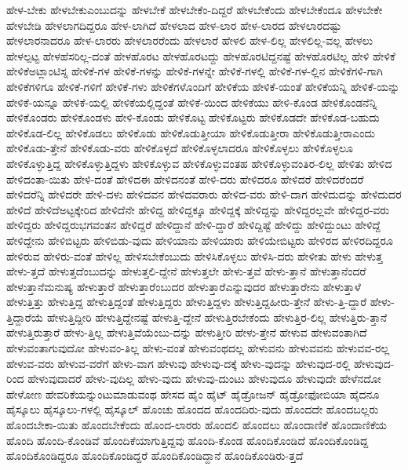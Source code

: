 {ಹೇಳ-ಬೇಕು
ಹೇಳಬೇಕುಎಂಬುದನ್ನು
ಹೇಳಬೇಕೆ
ಹೇಳಬೇಕೆಂ-ದಿದ್ದರೆ
ಹೇಳಬೇಕೆಂದು
ಹೇಳಬೇಕೆಂದೂ
ಹೇಳಬೇಕೇ
ಹೇಳಬೇಡಿ
ಹೇಳಲಾಗದಿದ್ದರೂ
ಹೇಳ-ಲಾಗಿದೆ
ಹೇಳಲಾದ
ಹೇಳ-ಲಾರ
ಹೇಳ-ಲಾರದ
ಹೇಳಲಾರದಷ್ಟು
ಹೇಳಲಾರನಾದರೂ
ಹೇಳ-ಲಾರರು
ಹೇಳಲಾರರೆಂದು
ಹೇಳಲಾರೆ
ಹೇಳಲಿ
ಹೇಳ-ಲಿಲ್ಲ
ಹೇಳಲಿಲ್ಲ-ವಲ್ಲ
ಹೇಳಲು
ಹೇಳಲ್ಪಟ್ಟ
ಹೇಳಹೆಸರಿಲ್ಲ-ದಂತೆ
ಹೇಳಹೊರಟ
ಹೇಳಹೊರಟದ್ದು
ಹೇಳಹೊರಟಿದ್ದನಷ್ಟೆ
ಹೇಳಹೊರಟಿಲ್ಲ
ಹೇಳಿ
ಹೇಳಿಕೆ
ಹೇಳಿಕೆಅಟ್ಲಾಂಟಿಸ್ನ
ಹೇಳಿಕೆ-ಗಳ
ಹೇಳಿಕೆ-ಗಳನ್ನು
ಹೇಳಿಕೆ-ಗಳನ್ನೇ
ಹೇಳಿಕೆ-ಗಳಲ್ಲಿ
ಹೇಳಿಕೆ-ಗಳ-ಲ್ಲಿನ
ಹೇಳಿಕೆಗಳಿ-ಗಾಗಿ
ಹೇಳಿಕೆಗಳಿಗೂ
ಹೇಳಿಕೆ-ಗಳಿಗೆ
ಹೇಳಿಕೆ-ಗಳು
ಹೇಳಿಕೆಗಳೊಂದಿಗೆ
ಹೇಳಿಕೆಯ
ಹೇಳಿಕೆ-ಯಂತೆ
ಹೇಳಿಕೆಯನ್ನಿ
ಹೇಳಿಕೆ-ಯನ್ನು
ಹೇಳಿಕೆ-ಯನ್ನೂ
ಹೇಳಿಕೆ-ಯಲ್ಲಿ
ಹೇಳಿಕೆಯಲ್ಲಿದ್ದಂತೆ
ಹೇಳಿಕೆ-ಯಿಂದ
ಹೇಳಿಕೆಯು
ಹೇಳಿ-ಕೊಂಡ
ಹೇಳಿಕೊಂಡನೆನ್ನಿ
ಹೇಳಿಕೊಂಡರು
ಹೇಳಿಕೊಂಡಳು
ಹೇಳಿ-ಕೊಂಡು
ಹೇಳಿಕೊಟ್ಟ
ಹೇಳಿಕೊಟ್ಟರು
ಹೇಳಿಕೊಡದೇ
ಹೇಳಿಕೊಡ-ಬಹುದು
ಹೇಳಿಕೊಡ-ಲಿಲ್ಲ
ಹೇಳಿಕೊಡಲು
ಹೇಳಿಕೊಡು
ಹೇಳಿಕೊಡುತ್ತೀಯಾ
ಹೇಳಿಕೊಡುತ್ತೀರಾ
ಹೇಳಿಕೊಡುತ್ತೀರಾಎಂದು
ಹೇಳಿಕೊಡು-ತ್ತೇನೆ
ಹೇಳಿಕೊಡು-ವರು
ಹೇಳಿಕೊಳ್ಳದೆ
ಹೇಳಿಕೊಳ್ಳಲಾದರೂ
ಹೇಳಿಕೊಳ್ಳಲು
ಹೇಳಿಕೊಳ್ಳಲೂ
ಹೇಳಿಕೊಳ್ಳುತ್ತಿದ್ದ
ಹೇಳಿಕೊಳ್ಳುತ್ತಿದ್ದಳು
ಹೇಳಿಕೊಳ್ಳುವ
ಹೇಳಿಕೊಳ್ಳುವಂತಹ
ಹೇಳಿಕೊಳ್ಳುವಂತಿರ-ಲಿಲ್ಲ
ಹೇಳಿತು
ಹೇಳಿದ
ಹೇಳಿದಂತಾ-ಯಿತು
ಹೇಳಿ-ದಂತೆ
ಹೇಳಿದಈ
ಹೇಳಿದನಂತೆ
ಹೇಳಿ-ದರು
ಹೇಳಿದರೂ
ಹೇಳಿದರೆ
ಹೇಳಿದರೆಂದರೆ
ಹೇಳಿದರೆನ್ನಿ
ಹೇಳಿದರೇ
ಹೇಳಿ-ದಳು
ಹೇಳಿದವನ
ಹೇಳಿದವರಾರು
ಹೇಳಿದ-ವರು
ಹೇಳಿ-ದಾಗ
ಹೇಳಿದುದನ್ನು
ಹೇಳಿದುದರ
ಹೇಳಿದೆ
ಹೇಳಿದೆಅಟ್ಟಕ್ಕೇರಿದ
ಹೇಳಿದೆನೇ
ಹೇಳಿದ್ದ
ಹೇಳಿದ್ದಕ್ಕೂ
ಹೇಳಿದ್ದಕ್ಕೆ
ಹೇಳಿದ್ದನ್ನು
ಹೇಳಿದ್ದರಲ್ಲವೇ
ಹೇಳಿದ್ದರ-ವರು
ಹೇಳಿದ್ದರು
ಹೇಳಿದ್ದರುಭಗವಂತನ
ಹೇಳಿದ್ದರೆ
ಹೇಳಿದ್ದಾನೆ
ಹೇಳಿ-ದ್ದಾರೆ
ಹೇಳಿದ್ದಿಷ್ಟೆ
ಹೇಳಿದ್ದು
ಹೇಳಿದ್ದುಂಟು
ಹೇಳಿದ್ದೆ
ಹೇಳಿದ್ದೇನು
ಹೇಳಿಬಿಟ್ಟರು
ಹೇಳಿಬಿಡು-ವುದು
ಹೇಳಿಯಾನು
ಹೇಳಿಯಾರು
ಹೇಳಿಯೇಬಿಟ್ಟರು
ಹೇಳಿರದ
ಹೇಳಿರದಿದ್ದರೂ
ಹೇಳಿರುವ
ಹೇಳಿರು-ವಂತೆ
ಹೇಳಿಲ್ಲ
ಹೇಳಿಸಬೇಕೆಂಬುದು
ಹೇಳಿಸಿಕೊಳ್ಳಲು
ಹೇಳಿಸಿ-ದರು
ಹೇಳೀತು
ಹೇಳು
ಹೇಳುತ್ತ
ಹೇಳು-ತ್ತದೆ
ಹೇಳುತ್ತದೆಂಬುದನ್ನು
ಹೇಳುತ್ತಲಿ-ದ್ದೇನೆ
ಹೇಳುತ್ತಲೇ
ಹೇಳು-ತ್ತವೆ
ಹೇಳು-ತ್ತಾನೆ
ಹೇಳುತ್ತಾನೆಂದರೆ
ಹೇಳುತ್ತಾನೆಮನುಷ್ಯ
ಹೇಳುತ್ತಾರೆ
ಹೇಳುತ್ತಾರೆಂಬುದರ
ಹೇಳುತ್ತಾರೆಎನ್ನುವುದರ
ಹೇಳುತ್ತಾರೇನು
ಹೇಳುತ್ತಾಳೆ
ಹೇಳುತ್ತಿತ್ತು
ಹೇಳುತ್ತಿದ್ದ
ಹೇಳುತ್ತಿದ್ದಂತೆ
ಹೇಳುತ್ತಿದ್ದರು
ಹೇಳುತ್ತಿದ್ದಳು
ಹೇಳುತ್ತಿದ್ದಹೀರು-ತ್ತೇನೆ
ಹೇಳು-ತ್ತಿ-ದ್ದಾರೆ
ಹೇಳು-ತ್ತಿದ್ದಾರೆಯೆ
ಹೇಳುತ್ತಿದ್ದೀರಿ
ಹೇಳುತ್ತಿದ್ದೇನಷ್ಟೆ
ಹೇಳುತ್ತಿ-ದ್ದೇನೆ
ಹೇಳುತ್ತಿರಬೇಕೆಂದು
ಹೇಳುತ್ತಿರ-ಲಿಲ್ಲ
ಹೇಳುತ್ತಿರು-ತ್ತಾನೆ
ಹೇಳುತ್ತಿರುತ್ತಾರೆ
ಹೇಳು-ತ್ತಿಲ್ಲ
ಹೇಳುತ್ತಿವೆಯೆಂಬು-ದನ್ನು
ಹೇಳುತ್ತೀರಿ
ಹೇಳು-ತ್ತೇನೆ
ಹೇಳುವ
ಹೇಳುವಂತಾಗಿದೆ
ಹೇಳುವಂತಾಗುವುದೋ
ಹೇಳುವಂ-ತಿಲ್ಲ
ಹೇಳು-ವಂತೆ
ಹೇಳುವಂಥದಲ್ಲ
ಹೇಳುವನು
ಹೇಳುವವನು
ಹೇಳುವವ-ರಲ್ಲ
ಹೇಳುವ-ವರು
ಹೇಳುವ-ವರೆಗೆ
ಹೇಳು-ವಾಗ
ಹೇಳುವು
ಹೇಳುವು-ದಕ್ಕೆ
ಹೇಳು-ವುದನ್ನು
ಹೇಳುವುದ-ರಲ್ಲಿ
ಹೇಳುವುದ-ರಿಂದ
ಹೇಳುವುದಾದರೆ
ಹೇಳು-ವುದಿಲ್ಲ
ಹೇಳು-ವುದು
ಹೇಳುವು-ದುಂಟು
ಹೇಳುವುದೂ
ಹೇಳುವುದೇ
ಹೇಳೆನದೋ
ಹೇಳೋಣ
ಹೇವರಿಕೆಯನ್ನುಂಟುಮಾಡುವಂಥ
ಹೇಸದ
ಹೈಂ
ಹೈಟ್
ಹೈಡ್ರೋಜನ್
ಹೈಡ್ರೋಫೋಬಿಯಾ
ಹೈದನೂ
ಹೈಸ್ಕೂಲು
ಹೈಸ್ಕೂಲು-ಗಳಲ್ಲಿ
ಹೈಸ್ಕೂಲ್
ಹೊಂಚು
ಹೊಂದದ
ಹೊಂದದಿರು-ವುದು
ಹೊಂದದೇ
ಹೊಂದಬಲ್ಲರು
ಹೊಂದಬೇಕಾ-ಯಿತು
ಹೊಂದಬೇಕೆಂದು
ಹೊಂದ-ಲಾರರು
ಹೊಂದಲಿ
ಹೊಂದಲು
ಹೊಂದಾಣಿಕೆ
ಹೊಂದಾಣಿಕೆಯ
ಹೊಂದಿ
ಹೊಂದಿ-ಕೊಂಡಿವೆ
ಹೊಂದಿಕೆಯಾಗುತ್ತಿದ್ದವು
ಹೊಂದಿ-ಕೊಂಡ
ಹೊಂದಿಕೊಂಡಿದೆ
ಹೊಂದಿಕೊಂಡಿದ್ದ
ಹೊಂದಿಕೊಂಡಿದ್ದರೂ
ಹೊಂದಿಕೊಂಡಿದ್ದರೆ
ಹೊಂದಿಕೊಂಡಿದ್ದಾನೆ
ಹೊಂದಿಕೊಂಡಿರು-ತ್ತದೆ
}
